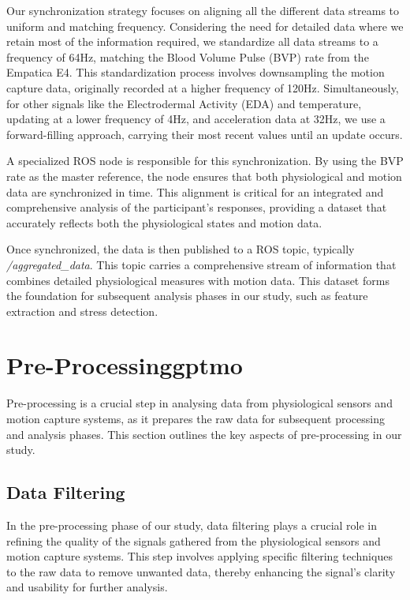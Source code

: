 Our synchronization strategy focuses on aligning all the different data streams to uniform and matching frequency. Considering the need for detailed data where we retain most of the information required, we standardize all data streams to a frequency of 64Hz, matching the Blood Volume Pulse (BVP) rate from the Empatica E4. This standardization process involves downsampling the motion capture data, originally recorded at a higher frequency of 120Hz. Simultaneously, for other signals like the Electrodermal Activity (EDA) and temperature, updating at a lower frequency of 4Hz, and acceleration data at 32Hz, we use a forward-filling approach, carrying their most recent values until an update occurs.

A specialized ROS node is responsible for this synchronization. By using the BVP rate as the master reference, the node ensures that both physiological and motion data are synchronized in time. This alignment is critical for an integrated and comprehensive analysis of the participant's responses, providing a dataset that accurately reflects both the physiological states and motion data.

Once synchronized, the data is then published to a ROS topic, typically \textit{/aggregated\_data}. This topic carries a comprehensive stream of information that combines detailed physiological measures with motion data. This dataset forms the foundation for subsequent analysis phases in our study, such as feature extraction and stress detection.

\section{Pre-Processing\gls*{gptmo}} 
Pre-processing is a crucial step in analysing data from physiological sensors and motion capture systems, as it prepares the raw data for subsequent processing and analysis phases. This section outlines the key aspects of pre-processing in our study.

\subsection*{Data Filtering} \label{sec:data_filtering}

In the pre-processing phase of our study, data filtering plays a crucial role in refining the quality of the signals gathered from the physiological sensors and motion capture systems. This step involves applying specific filtering techniques to the raw data to remove unwanted data, thereby enhancing the signal's clarity and usability for further analysis.


